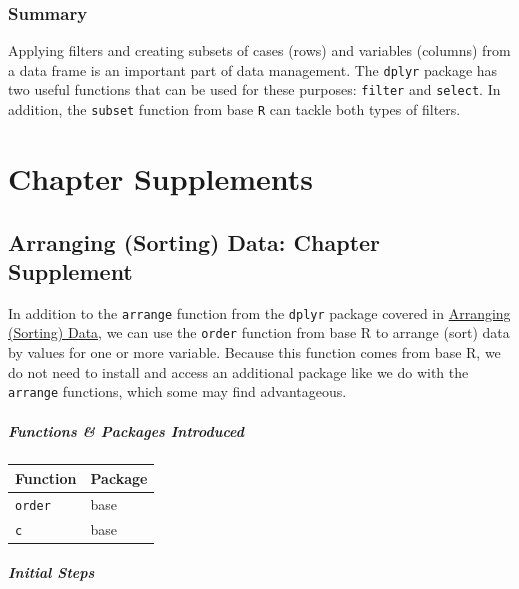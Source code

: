 \documentclass[]{book}
\begin{document}
\section{Summary}\label{summary}

Applying filters and creating subsets of cases (rows) and variables
(columns) from a data frame is an important part of data management. The
\texttt{dplyr} package has two useful functions that can be used for
these purposes: \texttt{filter} and \texttt{select}. In addition, the
\texttt{subset} function from base \texttt{R} can tackle both types of
filters.

\part*{Chapter Supplements}\label{part-chapter-supplements}

\hypertarget{arrange_supplement}{\chapter*{Arranging (Sorting) Data:
Chapter Supplement}\label{arrange_supplement}}

In addition to the \texttt{arrange} function from the \texttt{dplyr}
package covered in \protect\hyperlink{arrange}{Arranging (Sorting)
Data}, we can use the \texttt{order} function from base R to arrange
(sort) data by values for one or more variable. Because this function
comes from base R, we do not need to install and access an additional
package like we do with the \texttt{arrange} functions, which some may
find advantageous.

\subsubsection*{Functions \& Packages
Introduced}\label{functions-packages-introduced}

\begin{longtable}[]{@{}ll@{}}
\toprule
Function & Package\tabularnewline
\midrule
\endhead
\texttt{order} & base\tabularnewline
\texttt{c} & base\tabularnewline
\bottomrule
\end{longtable}

\subsubsection*{Initial Steps}\label{initsteps_arrange_supp}
\end{document}
